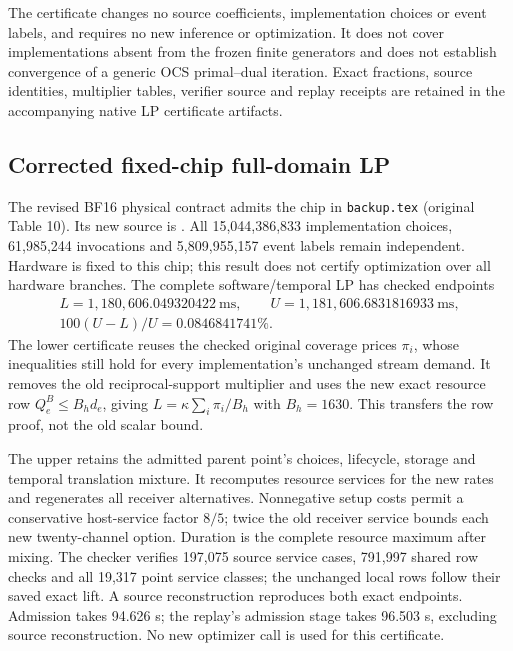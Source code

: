 The certificate changes no source coefficients, implementation choices or
event labels, and requires no new inference or optimization. It does not
cover implementations absent from the frozen finite generators and does not
establish convergence of a generic OCS primal--dual iteration. Exact fractions,
source identities, multiplier tables, verifier source and replay receipts
are retained in the accompanying native LP certificate artifacts.

\subsection{Corrected fixed-chip full-domain LP}
\label{app:corrected_native_lp}
The revised BF16 physical contract admits the chip in
\texttt{backup.tex} (original Table 10). Its new source is
.
All 15,044,386,833 implementation choices, 61,985,244 invocations and
5,809,955,157 event labels remain independent. Hardware is fixed to this
chip; this result does not certify optimization over all hardware branches.
The complete software/temporal LP has checked endpoints
\[
 \begin{gathered}
 L=1{,}180{,}606.049320422\ \mathrm{ms},\qquad
 U=1{,}181{,}606.6831816933\ \mathrm{ms},\\
 100(U-L)/U=0.0846841741\%.
 \end{gathered}
\]
The lower certificate reuses the checked original coverage prices $\pi_i$,
whose inequalities still hold for every implementation's unchanged stream
demand. It removes the old reciprocal-support multiplier and uses the new
exact resource row $Q^B_e\le B_h d_e$, giving
$L=\kappa\sum_i\pi_i/B_h$ with $B_h=1630$.
This transfers the row proof, not the old scalar bound.

The upper retains the admitted parent point's choices, lifecycle, storage
and temporal translation mixture. It recomputes resource services for the
new rates and regenerates all receiver alternatives. Nonnegative setup
costs permit a conservative host-service factor $8/5$; twice the old
receiver service bounds each new twenty-channel option. Duration is the
complete resource maximum after mixing. The checker verifies 197,075 source
service cases, 791,997 shared row checks and all 19,317 point service classes;
the unchanged local rows follow their saved exact lift. A source
reconstruction reproduces both exact endpoints. Admission takes 94.626 s;
the replay's admission stage takes 96.503 s, excluding source reconstruction.
No new optimizer call is used for this certificate.

